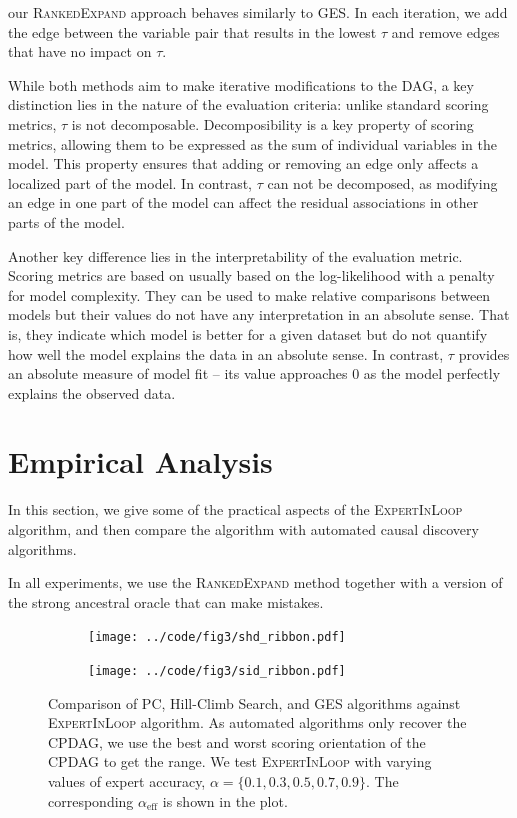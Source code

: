 \documentclass{uai2025} %
\begin{document}
our \textsc{RankedExpand} approach behaves similarly to GES. In each iteration,
we add the edge between the variable pair that results in the lowest $ \tau $
and remove edges that have no impact on $ \tau $.

While both methods aim to make iterative modifications to the DAG, a key
distinction lies in the nature of the evaluation criteria: unlike standard
scoring metrics, $ \tau $ is not decomposable. Decomposibility is a key
property of scoring metrics, allowing them to be expressed as the sum of
individual variables in the model. This property ensures that adding or
removing an edge only affects a localized part of the model. In contrast, $
\tau $ can not be decomposed, as modifying an edge in one part of the model can
affect the residual associations in other parts of the model.

Another key difference lies in the interpretability of the evaluation metric.
Scoring metrics are based on usually based on the log-likelihood with a penalty
for model complexity. They can be used to make relative comparisons between
models but their values do not have any interpretation in an absolute sense.
That is, they indicate which model is better for a given dataset but do not
quantify how well the model explains the data in an absolute sense. In
contrast, $ \tau $ provides an absolute measure of model fit -- its value
approaches $ 0 $ as the model perfectly explains the observed data.


\section{Empirical Analysis}
\label{sec:empirical}

In this section, we give some of the practical aspects of the
\textsc{ExpertInLoop} algorithm, and then compare the algorithm with automated
causal discovery algorithms.

In all experiments, we use the \textsc{RankedExpand} method together
with a version of the strong ancestral oracle that can make mistakes.


\begin{figure}[t!]
	\centering
	\begin{subfigure}{0.5\textwidth}
		\centering
		\texttt{[image: ../code/fig3/shd\_ribbon.pdf]}
		\caption{}
	\end{subfigure}
	\begin{subfigure}{0.5\textwidth}
		\centering
		\texttt{[image: ../code/fig3/sid\_ribbon.pdf]}
		\caption{}
	\end{subfigure}
	\caption{Comparison of PC, Hill-Climb Search, and GES algorithms against
		\textsc{ExpertInLoop} algorithm. As automated algorithms only
		recover the CPDAG, we use the best and worst scoring
		orientation of the CPDAG to get the range. We test
		\textsc{ExpertInLoop} with varying values of expert accuracy, $ \alpha = \{0.1, 0.3, 0.5, 0.7, 0.9\} $. The corresponding
		$\alpha_{\textrm{eff}} $ is shown in the plot.}
	\label{fig:shd_sid}
\end{figure}
\end{document}
